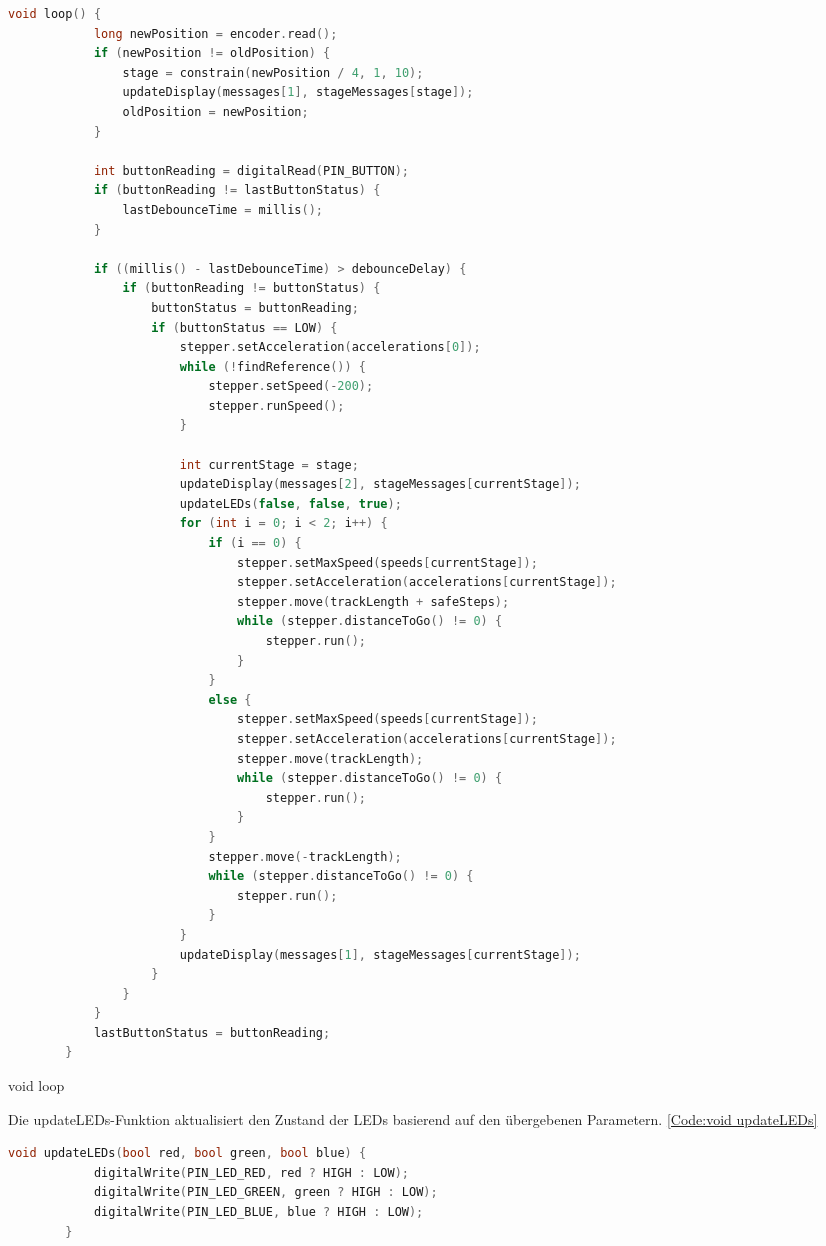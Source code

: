 {{{\begin{code}
	\begin{lstlisting}[language=c++]
		void loop() {
			long newPosition = encoder.read();
			if (newPosition != oldPosition) {
				stage = constrain(newPosition / 4, 1, 10);
				updateDisplay(messages[1], stageMessages[stage]);
				oldPosition = newPosition;
			}
			
			int buttonReading = digitalRead(PIN_BUTTON);
			if (buttonReading != lastButtonStatus) {
				lastDebounceTime = millis();
			}
			
			if ((millis() - lastDebounceTime) > debounceDelay) {
				if (buttonReading != buttonStatus) {
					buttonStatus = buttonReading;
					if (buttonStatus == LOW) {
						stepper.setAcceleration(accelerations[0]);
						while (!findReference()) {
							stepper.setSpeed(-200);
							stepper.runSpeed();
						}
						
						int currentStage = stage;
						updateDisplay(messages[2], stageMessages[currentStage]);
						updateLEDs(false, false, true);
						for (int i = 0; i < 2; i++) {
							if (i == 0) {
								stepper.setMaxSpeed(speeds[currentStage]);
								stepper.setAcceleration(accelerations[currentStage]);
								stepper.move(trackLength + safeSteps);
								while (stepper.distanceToGo() != 0) {
									stepper.run();
								}
							}
							else {
								stepper.setMaxSpeed(speeds[currentStage]);
								stepper.setAcceleration(accelerations[currentStage]);
								stepper.move(trackLength);
								while (stepper.distanceToGo() != 0) {
									stepper.run();
								}
							}
							stepper.move(-trackLength);
							while (stepper.distanceToGo() != 0) {
								stepper.run();
							}
						}
						updateDisplay(messages[1], stageMessages[currentStage]);
					}
				}
			}
			lastButtonStatus = buttonReading;
		}
	\end{lstlisting}      
	
	\caption[void loop]{void loop}\label{Code:void loop}    
\end{code} 

Die updateLEDs-Funktion aktualisiert den Zustand der LEDs basierend auf den übergebenen Parametern. \ref{Code:void updateLEDs}

\begin{code}
	\begin{lstlisting}[language=c++]
		void updateLEDs(bool red, bool green, bool blue) {
			digitalWrite(PIN_LED_RED, red ? HIGH : LOW);
			digitalWrite(PIN_LED_GREEN, green ? HIGH : LOW);
			digitalWrite(PIN_LED_BLUE, blue ? HIGH : LOW);
		}
	\end{lstlisting}      
	

\end{code}}}}
